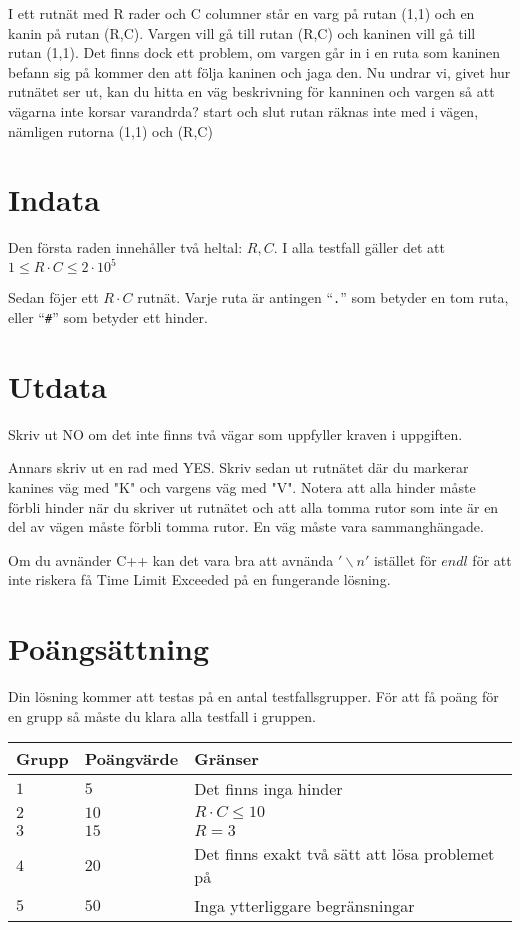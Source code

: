 I ett rutnät med R rader och C columner står en varg på rutan (1,1) och en kanin på rutan (R,C). Vargen vill gå till rutan (R,C) och kaninen vill gå till rutan (1,1). Det finns dock ett problem, om vargen går in i en ruta som kaninen befann sig på kommer den att följa kaninen och jaga den. Nu undrar vi, givet hur rutnätet ser ut, kan du hitta en väg beskrivning för kanninen och vargen så att vägarna inte korsar varandrda? start och slut rutan räknas inte med i vägen, nämligen rutorna (1,1) och (R,C) 



\section*{Indata}
Den första raden innehåller två heltal: $ R, C$. I alla testfall gäller det att $1 \leq R \cdot C \leq 2 \cdot 10^5$

Sedan föjer ett $R \cdot C$ rutnät. Varje ruta är antingen ``\verb!.!'' som betyder en tom ruta, eller ``\verb!#!'' som betyder ett hinder.

\section*{Utdata}
Skriv ut NO om det inte finns två vägar som uppfyller kraven i uppgiften.

Annars skriv ut en rad med YES. Skriv sedan ut rutnätet där du markerar kanines väg med "K" och vargens väg med "V". Notera att alla hinder måste förbli hinder när du skriver ut rutnätet och att alla tomma rutor som inte är en del av vägen måste förbli tomma rutor. En väg måste vara sammanghängade.

Om du avnänder C++ kan det vara bra att avnända $'\backslash n'$ istället för $endl$ för att inte riskera få Time Limit Exceeded på en fungerande lösning.

\section*{Poängsättning}
Din lösning kommer att testas på en antal testfallsgrupper.
För att få poäng för en grupp så måste du klara alla testfall i gruppen.

\noindent
\begin{tabular}{| l | l | p{12cm} |}
  \hline
  Grupp & Poängvärde & Gränser \\ \hline
  $1$   & $5$       & Det finns inga hinder\\ \hline
  $2$   & $10$       & $R \cdot C \leq 10$  \\ \hline
  $3$   & $15$       & $R= 3$  \\ \hline
  $4$   & $20$       & Det finns exakt två sätt att lösa problemet på  \\ \hline
  $5$   & $50$       & Inga ytterliggare begränsningar  \\ \hline
\end{tabular}

